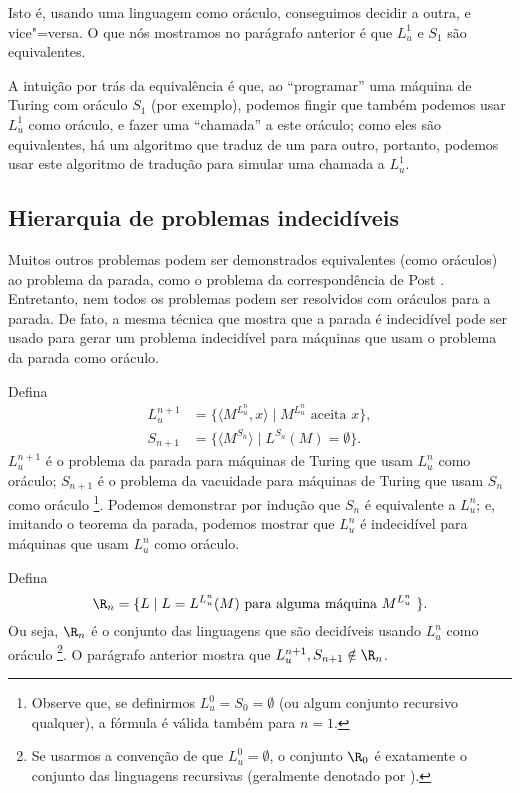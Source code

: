 Isto é, usando uma linguagem como oráculo, conseguimos decidir a outra,
e vice"=versa.
O que nós mostramos no parágrafo anterior é que
$L_u^1$ e $S_1$ são equivalentes.

A intuição por trás da equivalência é que,
ao ``programar'' uma máquina de Turing com oráculo $S_1$ (por exemplo),
podemos fingir que também podemos usar $L_u^1$ como oráculo,
e fazer uma ``chamada'' a este oráculo;
como eles são equivalentes,
há um algoritmo que traduz de um para outro,
portanto, podemos usar este algoritmo de tradução
para simular uma chamada a $L_u^1$.

\subsection{Hierarquia de problemas indecidíveis}

Muitos outros problemas podem ser demonstrados equivalentes
(como oráculos)
ao problema da parada,
como o problema da correspondência de Post \cite[p.~214]{HopcroftUllman1979}.
Entretanto,
nem todos os problemas podem ser resolvidos com oráculos para a parada.
De fato, a mesma técnica que mostra que a parada é indecidível
pode ser usado para gerar um problema indecidível
para máquinas que usam o problema da parada como oráculo.

Defina
\begin{align*}
    L_u^{n+1} &= \{ \langle M^{L_u^n}, x \rangle \mid M^{L_u^n} \text{ aceita } x \}, \\
    S_{n+1} &= \{ \langle M^{S_n} \rangle \mid L^{S_n}(M) = \emptyset \}.
\end{align*}
$L_u^{n+1}$ é o problema da parada
para máquinas de Turing que usam $L_u^n$ como oráculo;
$S_{n+1}$ é o problema da vacuidade
para máquinas de Turing que usam $S_n$ como oráculo%
\footnote{
    Observe que,
    se definirmos $L_u^0 = S_0 = \emptyset$
    (ou algum conjunto recursivo qualquer),
    a fórmula é válida também para $n = 1$.
}.
Podemos demonstrar por indução que $S_n$ é equivalente a $L_u^n$;
e, imitando o teorema da parada,
podemos mostrar que $L_u^n$ é indecidível para máquinas que usam $L_u^n$ como oráculo.

Defina
\begin{equation*}
    \R_n = \{ L \mid L = L^{L_u^n}(M) \text{ para alguma máquina $M^{L_u^n}$ } \}.
\end{equation*}
Ou seja, $\R_n$ é o conjunto das linguagens
que são decidíveis usando $L_u^n$ como oráculo%
\footnote{
    Se usarmos a convenção de que $L_u^0 = \emptyset$,
    o conjunto $\R_0$ é exatamente o conjunto das linguagens recursivas
    (geralmente denotado por \R).
}.
O parágrafo anterior mostra que $L_u^{n+1}, S_{n+1} \notin \R_n$.

